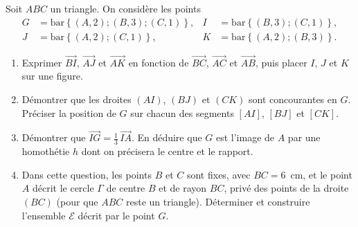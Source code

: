 \begin{exo}\label{exo:bary-11}
      Soit $ABC$ un triangle. On consid\`ere les points
      \begin{align*}
            G&=\mathrm{bar}\left\lbrace(A,2);(B,3);(C,1)\right\rbrace, &
            I&=\mathrm{bar}\left\lbrace(B,3);(C,1)\right\rbrace,\\
            J&=\mathrm{bar}\left\lbrace(A,2);(C,1)\right\rbrace, &
            K&=\mathrm{bar}\left\lbrace(A,2);(B,3)\right\rbrace.
      \end{align*}
      \begin{enumerate}
            \item Exprimer $\overrightarrow{BI}$, $\overrightarrow{AJ}$ et $\overrightarrow{AK}$ en fonction de
                  $\overrightarrow{BC}$, $\overrightarrow{AC}$ et $\overrightarrow{AB}$, puis placer $I$, $J$ et $K$ sur une figure.
            \item D\'emontrer que les droites $(AI)$, $(BJ)$ et $(CK)$ sont concourantes en $G$.
                  Pr\'eciser la position de $G$ sur chacun des segments $[AI]$, $[BJ]$ et $[CK]$.
            \item D\'emontrer que $\overrightarrow{IG} = \frac{1}{3}\,\overrightarrow{IA}$.
                  En d\'eduire que $G$ est l'image de $A$ par une homoth\'etie $h$ dont on pr\'ecisera le centre et le rapport.
            \item Dans cette question, les points $B$ et $C$ sont fixes, avec $BC = 6$~cm, et le point $A$ d\'ecrit le cercle $\Gamma$
                  de centre $B$ et de rayon $BC$, priv\'e des points de la droite $(BC)$ (pour que $ABC$ reste un triangle).
                  D\'eterminer et construire l'ensemble $\mathcal{E}$ d\'ecrit par le point $G$.
      \end{enumerate}
\end{exo}
%

